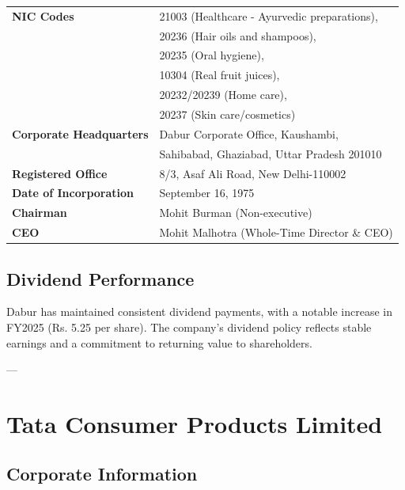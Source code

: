 \documentclass[12pt, a4paper]{report}
\begin{document}
\begin{tabular}{ll}
    \textbf{NIC Codes} & 21003 (Healthcare - Ayurvedic preparations), \\
                       & 20236 (Hair oils and shampoos), \\
                       & 20235 (Oral hygiene), \\
                       & 10304 (Real fruit juices), \\
                       & 20232/20239 (Home care), \\
                       & 20237 (Skin care/cosmetics) \\
    \textbf{Corporate Headquarters} & Dabur Corporate Office, Kaushambi, \\
                                   & Sahibabad, Ghaziabad, Uttar Pradesh 201010 \\
    \textbf{Registered Office} & 8/3, Asaf Ali Road, New Delhi-110002 \\
    \textbf{Date of Incorporation} & September 16, 1975 \\
    \textbf{Chairman} & Mohit Burman (Non-executive) \\
    \textbf{CEO} & Mohit Malhotra (Whole-Time Director \& CEO) \\
\end{tabular}

\subsection{Dividend Performance}

Dabur has maintained consistent dividend payments, with a notable increase in FY2025 (Rs. 5.25 per share). The company's dividend policy reflects stable earnings and a commitment to returning value to shareholders.

---

\section{Tata Consumer Products Limited}

\subsection{Corporate Information}
\end{document}
